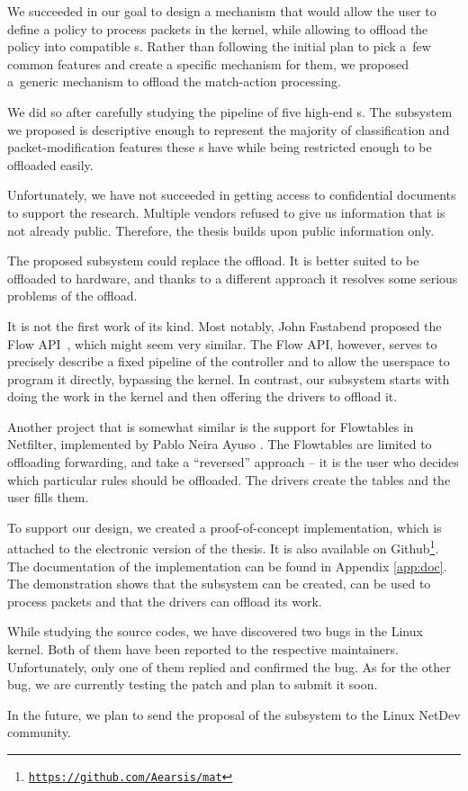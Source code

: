 
We succeeded in our goal to design a mechanism that would allow the user to
define a policy to process packets in the kernel, while allowing to offload the
policy into compatible s. Rather than following the initial plan to pick
a~few common features and create a specific mechanism for them, we
proposed a~generic mechanism to offload the match-action processing.

We did so after carefully studying the pipeline of five high-end s.
The subsystem we proposed is descriptive enough to represent the majority of
classification and packet-modification features these s have while
being restricted enough to be offloaded easily.

Unfortunately, we have not succeeded in getting access to confidential
documents to support the research. Multiple vendors refused to give us
information that is not already public. Therefore, the thesis builds upon
public information only.

The proposed subsystem could replace the  offload. It is better suited to be
offloaded to hardware, and thanks to a different approach it resolves some
serious problems of the  offload.

It is not the first work of its kind. Most notably, John Fastabend proposed
the Flow API~\cite{flow-api}, which might seem very similar. The
Flow API, however, serves to precisely describe a fixed pipeline of the
controller and to allow the userspace to program it directly, bypassing the
kernel. In contrast, our subsystem starts with doing the work in the kernel and
then offering the drivers to offload it.

Another project that is somewhat similar is the support for Flowtables in
Netfilter, implemented by Pablo Neira Ayuso \cite{flowtables}. The Flowtables
are limited to offloading forwarding, and take a ``reversed'' approach -- it is
the user who decides which particular rules should be offloaded. The drivers
create the tables and the user fills them.

To support our design, we created a proof-of-concept implementation, which
is attached to the electronic version of the thesis. It is also available
on Github\footnote{\href{https://github.com/Aearsis/mat}{\texttt{https://github.com/Aearsis/mat}}}.
The documentation of the implementation can be found in Appendix
\ref{app:doc}. The demonstration shows that the subsystem can be created, can
be used to process packets and that the drivers can offload its work.

While studying the source codes, we have discovered two bugs in the Linux kernel.
Both of them have been reported to the respective maintainers. Unfortunately,
only one of them replied and confirmed the bug. As for the other bug, we are
currently testing the patch and plan to submit it soon.

In the future, we plan to send the proposal of the subsystem to the Linux
NetDev community.
